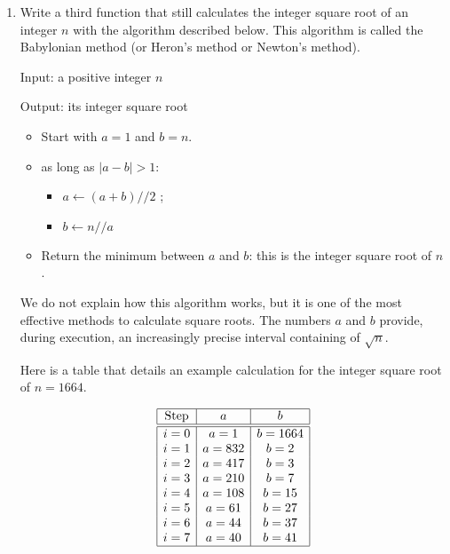 \documentclass[11pt,class=report,crop=false]{standalone}
\begin{document}
\begin{activite}
\begin{enumerate}
  \item Write a third function that still calculates the integer square root of an integer $n$ with the algorithm described below. This algorithm is called the Babylonian method (or Heron's method or Newton's method).
  
    \begin{algorithme}
  Input: a positive integer $n$

  Output: its integer square root

  \begin{itemize}
    \item Start with $a=1$ and $b=n$.
    
    \item as long as $|a-b| > 1$:
    \begin{itemize} 
     \item $a \leftarrow (a+b)//2$ ;
     \item $b \leftarrow n // a$ 
    \end{itemize}          
         
    \item Return the minimum between $a$ and $b$: this is the integer square root of $n$.
  \end{itemize} 
           
 \end{algorithme}
 
 
  We do not explain how this algorithm works, but it is one of the most effective methods to calculate square roots. The numbers $a$ and $b$ provide, during execution, an increasingly precise interval containing of $\sqrt{n}$. 
  
  Here is a table that details an example calculation for the integer square root of $n=1664$.

  \medskip
  
$$\begin{array}{|c|c|c|} 
\hline
\text{Step} & a & b \\ \hline\hline
i = 0  &  a =  1    &  b =  1664 \\
i = 1  &  a =  832  &  b =  2 \\
i = 2  &  a =  417  &  b =  3 \\
i = 3  &  a =  210  &  b =  7 \\
i = 4  &  a =  108  &  b =  15 \\
i = 5  &  a =  61   &  b =  27 \\
i = 6  &  a =  44   &  b =  37 \\
i = 7  &  a =  40   &  b =  41 \\ \hline
\end{array}$$


\end{enumerate}
\end{activite}
\end{document}
